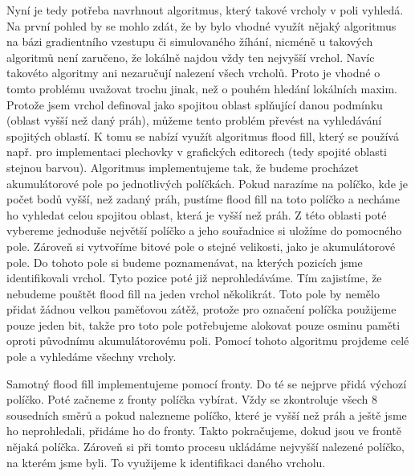 \documentclass[11pt,twoside,a4paper]{book}
\begin{document}
Nyní je tedy potřeba navrhnout algoritmus, který takové vrcholy v poli vyhledá. Na první pohled by se mohlo zdát, že by bylo vhodné využít nějaký algoritmus na bázi gradientního vzestupu či simulovaného žíhání, nicméně u takových algoritmů není zaručeno, že lokálně najdou vždy ten nejvyšší vrchol. Navíc takovéto algoritmy ani nezaručují nalezení všech vrcholů. Proto je vhodné o tomto problému uvažovat trochu jinak, než o pouhém hledání lokálních maxim. Protože jsem vrchol definoval jako spojitou oblast splňující danou podmínku (oblast vyšší než daný práh), můžeme tento problém převést na vyhledávání spojitých oblastí. K tomu se nabízí využít algoritmus flood fill, který se používá např. pro implementaci plechovky v grafických editorech (tedy  spojité oblasti stejnou barvou). Algoritmus implementujeme tak, že budeme procházet akumulátorové pole po jednotlivých políčkách. Pokud narazíme na políčko, kde je počet bodů vyšší, než zadaný práh, pustíme flood fill na toto políčko a necháme ho vyhledat celou spojitou oblast, která je vyšší než práh. Z této oblasti poté vybereme jednoduše největší políčko a jeho souřadnice si uložíme do pomocného pole. Zároveň si vytvoříme bitové pole o stejné velikosti, jako je akumulátorové pole. Do tohoto pole si budeme poznamenávat, na kterých pozicích jsme identifikovali vrchol. Tyto pozice poté již neprohledáváme. Tím zajistíme, že nebudeme pouštět flood fill na jeden vrchol několikrát. Toto pole by nemělo přidat žádnou velkou paměťovou zátěž, protože pro označení políčka použijeme pouze jeden bit, takže pro toto pole potřebujeme alokovat pouze osminu paměti oproti původnímu akumulátorovému poli. Pomocí tohoto algoritmu projdeme celé pole a vyhledáme všechny vrcholy.

Samotný flood fill implementujeme pomocí fronty. Do té se nejprve přidá výchozí políčko. Poté začneme z fronty políčka vybírat. Vždy se zkontroluje všech 8 sousedních směrů a pokud nalezneme políčko, které je vyšší než práh a ještě jsme ho neprohledali, přidáme ho do fronty. Takto pokračujeme, dokud jsou ve frontě nějaká políčka. Zároveň si při tomto procesu ukládáme nejvyšší nalezené políčko, na kterém jsme byli. To využijeme k identifikaci daného vrcholu.
\end{document}
